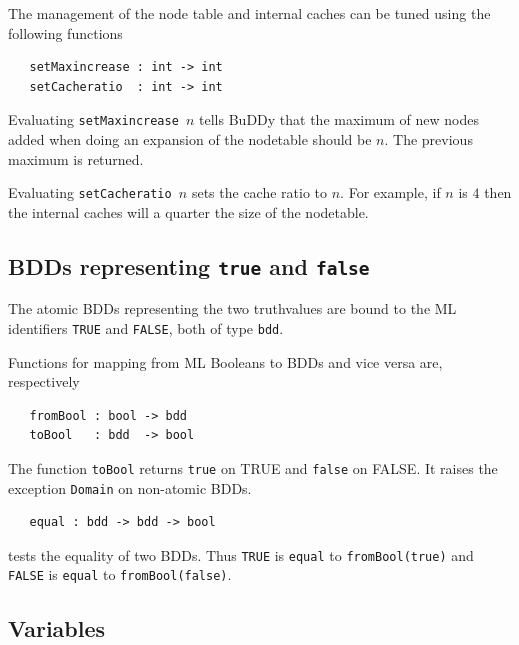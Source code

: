 \documentclass[12pt,fleqn]{article}
\renewcommand{\t}[1]{\mbox{\tt #1}}
\newcommand{\Buddy}{BuDDy{}}
\begin{document}
\medskip

The management of the node table and internal caches can be tuned
using the following functions


\begin{verbatim}
   setMaxincrease : int -> int
   setCacheratio  : int -> int
\end{verbatim}

Evaluating \t{setMaxincrease~$n$} tells \Buddy{} that the maximum of new nodes added
when doing an expansion of the nodetable should be $n$.  The previous maximum is returned.

Evaluating \t{setCacheratio~$n$} sets the cache ratio to $n$.  
For example, if $n$ is $4$ then the internal caches will a quarter the size of the
nodetable.

\subsection{BDDs representing {\t{true}} and {\t{false}}}

The atomic BDDs representing the two truthvalues are bound to the ML
identifiers \t{TRUE} and \t{FALSE}, both of type \t{bdd}.

Functions for mapping from ML Booleans to BDDs and vice versa are, respectively

\begin{verbatim}
   fromBool : bool -> bdd
   toBool   : bdd  -> bool
\end{verbatim}

The function \t{toBool} returns \t{true} on TRUE and \t{false} on FALSE.
It raises the exception \t{Domain} on non-atomic BDDs.

\begin{verbatim}
   equal : bdd -> bdd -> bool
\end{verbatim}

tests the equality of two BDDs. Thus \t{TRUE} is \t{equal} to \t{fromBool(true)} and 
\t{FALSE} is \t{equal} to \t{fromBool(false)}.

\subsection{Variables}
\end{document}
